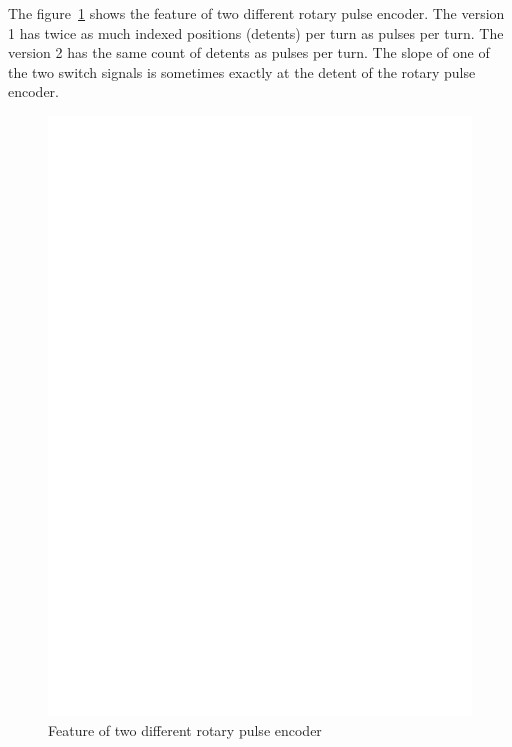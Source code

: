 The figure~\ref{fig:RotEnc} shows the feature of two different rotary pulse encoder.
The version 1 has twice as much indexed positions (detents) per turn as pulses per turn.
The version 2 has the same count of detents as pulses per turn.
The slope of one of the two switch signals is sometimes exactly at the detent of the 
rotary pulse encoder.

\begin{figure}[H]
\centering
\includegraphics[width=14cm]{../FIG/rotary_encoder.eps}
\caption{Feature of two different rotary pulse encoder}
\label{fig:RotEnc}
\end{figure}

